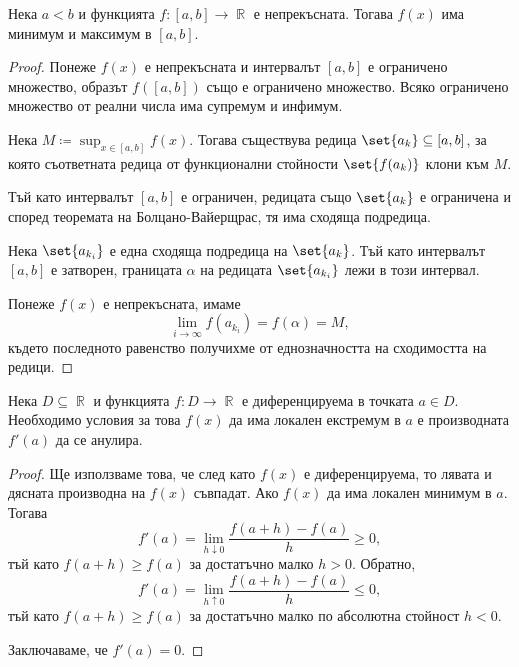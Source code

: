 \documentclass{../../common/topic}
\begin{document}
\begin{theorem}[Вайерщрас]
  Нека \( a < b \) и функцията \( f: [a, b] \to \BbbR \) е непрекъсната. Тогава \( f(x) \) има минимум и максимум в \( [a, b] \).
\end{theorem}
\begin{proof}
  Понеже \( f(x) \) е непрекъсната и интервалът \( [a, b] \) е ограничено множество, образът \( f([a, b]) \) също е ограничено множество. Всяко ограничено множество от реални числа има супремум и инфимум.

  Нека \( M \coloneqq \sup_{x \in [a, b]} f(x) \). Тогава съществува редица \( \set{ a_k } \subseteq [a, b] \), за която съответната редица от функционални стойности \( \set{ f(a_k) } \) клони към \( M \).

  Тъй като интервалът \( [a, b] \) е ограничен, редицата също \( \set{ a_k } \) е ограничена и според теоремата на Болцано-Вайерщрас, тя има сходяща подредица.

  Нека \( \set{ a_{k_i} } \) е една сходяща подредица на \( \set{ a_k } \). Тъй като интервалът \( [a, b] \) е затворен, границата \( \alpha \) на редицата \( \set{ a_{k_i} } \) лежи в този интервал.

  Понеже \( f(x) \) е непрекъсната, имаме
  \begin{equation*}
    \lim_{i \to \infty} f(a_{k_i}) = f(\alpha) = M,
  \end{equation*}
  където последното равенство получихме от еднозначността на сходимостта на редици.
\end{proof}

\begin{theorem}[Ферма]
  Нека \( D \subseteq \BbbR \) и функцията \( f: D \to \BbbR \) е диференцируема в точката \( a \in D \). Необходимо условия за това \( f(x) \) да има локален екстремум в \( a \) е производната \( f'(a) \) да се анулира.
\end{theorem}
\begin{proof}
  Ще използваме това, че след като \( f(x) \) е диференцируема, то лявата и дясната производна на \( f(x) \) съвпадат. Ако \( f(x) \) да има локален минимум в \( a \). Тогава
  \begin{equation*}
    f'(a) = \lim_{h \downarrow 0} \frac {f(a+h) - f(a)} h \geq 0,
  \end{equation*}
  тъй като \( f(a+h) \geq f(a) \) за достатъчно малко \( h > 0 \). Обратно,
  \begin{equation*}
    f'(a) = \lim_{h \uparrow 0} \frac {f(a+h) - f(a)} h \leq 0,
  \end{equation*}
  тъй като \( f(a+h) \geq f(a) \) за достатъчно малко по абсолютна стойност \( h < 0 \).

  Заключаваме, че \( f'(a) = 0 \).
\end{proof}
\end{document}
